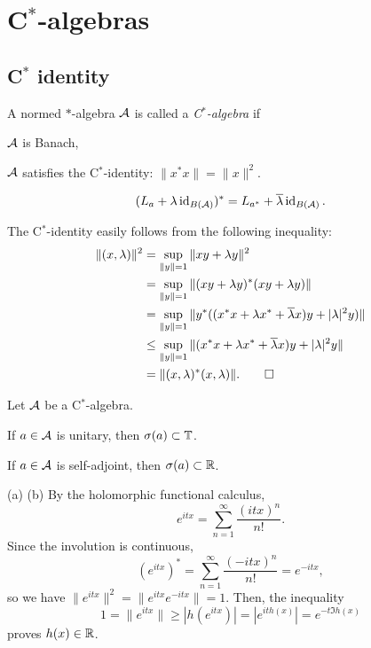 \documentclass{../note}
\begin{document}
\chapter{C$^*$-algebras}

\section{C$^*$ identity}


\begin{prb}[C$^*$ identity]
A normed $*$-algebra $\cA$ is called a \emph{C$^*$-algebra} if
\begin{parts}
\item $\cA$ is Banach,
\item $\cA$ satisfies the C$^*$-identity: $\|x^*x\|=\|x\|^2$.
\end{parts}
\end{prb}


\begin{prb}
\[(L_a+\lambda\id_{B(\cA)})^*=L_{a^*}+\bar\lambda\id_{B(\cA)}.\]
\end{prb}
\begin{pf}
The C$^*$-identity easily follows from the following inequality:
\begin{align*}
\|(x,\lambda)\|^2&=\sup_{\|y\|=1}\|xy+\lambda y\|^2\\
&=\sup_{\|y\|=1}\|(xy+\lambda y)^*(xy+\lambda y)\|\\
&=\sup_{\|y\|=1}\|y^*((x^*x+\lambda x^*+\bar\lambda x)y+|\lambda|^2y)\|\\
&\le\sup_{\|y\|=1}\|(x^*x+\lambda x^*+\bar\lambda x)y+|\lambda|^2y\|\\
&=\|(x,\lambda)^*(x,\lambda)\|.\qedhere
\end{align*}
\end{pf}


\begin{prb}
Let $\cA$ be a C$^*$-algebra.
\begin{parts}
\item If $a\in\cA$ is unitary, then $\sigma(a)\subset\T$.
\item If $a\in\cA$ is self-adjoint, then $\sigma(a)\subset\R$.
\end{parts}
\end{prb}
\begin{pf}
(a) (b)
By the holomorphic functional calculus,
\[e^{itx}=\sum_{n=1}^\infty\frac{(itx)^n}{n!}.\]
Since the involution is continuous,
\[(e^{itx})^*=\sum_{n=1}^\infty\frac{(-itx)^n}{n!}=e^{-itx},\]
so we have $\|e^{itx}\|^2=\|e^{itx}e^{-itx}\|=1$.
Then, the inequality
\[1=\|e^{itx}\|\ge|h(e^{itx})|=|e^{ith(x)}|=e^{-t\Im h(x)}\]
proves $h(x)\in\R$.

\end{pf}
\end{document}
